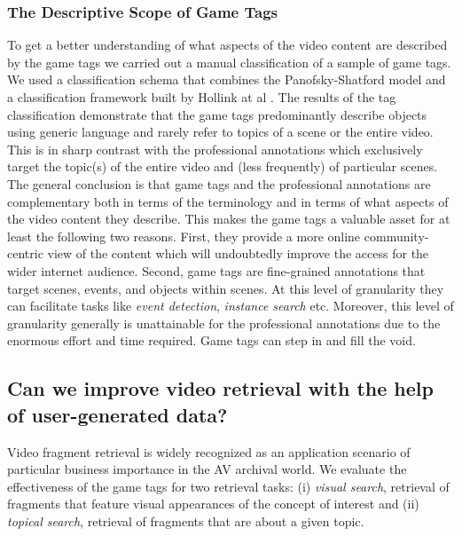 \subsubsection{The Descriptive Scope of Game Tags}
To get a better understanding of what aspects of the video content are described by the game tags we carried out a manual classification of a sample of game tags. We used a classification schema that combines the Panofsky-Shatford model and a classification framework built by Hollink at al \cite{laurapaper}. The results of the tag classification demonstrate that the game tags predominantly describe objects using generic language and rarely refer to topics of a scene or the entire video. This is in sharp contrast with the professional annotations which exclusively target the topic(s) of the entire video and (less frequently) of particular scenes. The general conclusion is that game tags and the professional annotations are complementary both in terms of the terminology and in terms of what aspects of the video content they describe. This makes the game tags a valuable asset for at least the following two reasons. First, they provide a more online community-centric view of the content which will undoubtedly improve the access for the wider internet audience. Second, game tags are fine-grained annotations that target scenes, events, and objects within scenes. At this level of granularity they can facilitate tasks like \textit{event detection}, \textit{instance search} etc. Moreover, this level of granularity generally is unattainable for the professional annotations due to the enormous effort and time required. Game tags can step in and fill the void.

\subsection{Can we improve video retrieval with the help of user-generated data?}\label{conclusion:search}
Video fragment retrieval is widely recognized as an application scenario of particular business importance in the AV archival world. We evaluate the effectiveness of the game tags for two retrieval tasks: (i) \textit{visual search}, retrieval of fragments that feature visual appearances of the concept of interest and (ii) \textit{topical search}, retrieval of fragments that are about a given topic.

